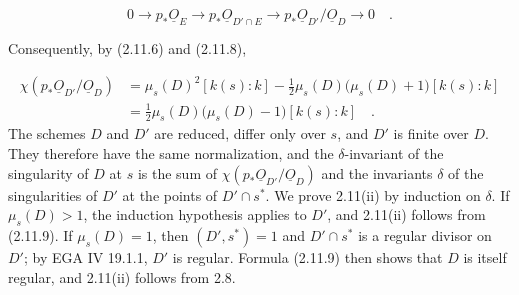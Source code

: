 \begin{equation*}
0\longrightarrow p_*\underline{O}_E
\longrightarrow p_*\underline{O}_{D'\cap E}
\longrightarrow p_*\underline{O}_{D'}/\underline{O}_D
\longrightarrow0 \quad .
\end{equation*}


Consequently, by (2.11.6) and (2.11.8),

\begin{equation}\tag{2.11.9}
\begin{aligned}
\chi(p_*\underline{O}_{D'}/\underline{O}_D)
&=\mu_s(D)^2[k(s):k]
-\frac12\mu_s(D)\bigl(\mu_s(D)+1\bigr)[k(s):k]\\
&=\frac12\mu_s(D)\bigl(\mu_s(D)-1\bigr)[k(s):k] \quad .
\end{aligned}
\end{equation}
The schemes $D$ and $D'$ are reduced, differ only over $s$, and $D'$ is finite
over $D$.  They therefore have the same normalization, and the $\delta$-invariant
of the singularity of $D$ at $s$ is the sum of
$\chi(p_*\underline{O}_{D'}/\underline{O}_D)$ and the invariants $\delta$ of the
singularities of $D'$ at the points of $D'\cap s^*$.  We prove 2.11(ii) by
induction on $\delta$.  If $\mu_s(D)>1$, the induction hypothesis applies to
$D'$, and 2.11(ii) follows from (2.11.9).  If $\mu_s(D)=1$, then
$(D',s^*)=1$ and $D'\cap s^*$ is a regular divisor on $D'$; by EGA IV 19.1.1,
$D'$ is regular.  Formula (2.11.9) then shows that $D$ is itself regular, and
2.11(ii) follows from 2.8.

